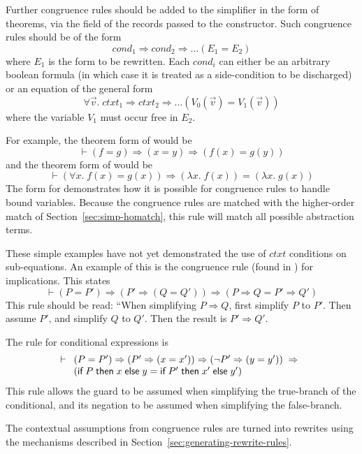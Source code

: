 Further congruence rules should be added to the simplifier in the form
of theorems, via the  field of the records passed to the
 constructor.  Such congruence rules should be of the form
\[
\mathit{cond_1} \Rightarrow \mathit{cond_2} \Rightarrow \dots (E_1 =
E_2)
\]
where $E_1$ is the form to be rewritten.  Each $\mathit{cond}_i$ can
either be an arbitrary boolean formula (in which case it is treated as
a side-condition to be discharged) or an equation of the general form
\[
\forall \vec{v}. \;\mathit{ctxt}_1 \Rightarrow \mathit{ctxt}_2
\Rightarrow \dots (V_0(\vec{v}) = V_1(\vec{v}))
\]
where the variable $V_1$ must occur free in $E_2$.

For example, the theorem form of  would be
\[
\vdash (f = g) \Rightarrow (x = y) \Rightarrow (f(x) = g(y))
\]
and the theorem form of  would be
\[
\vdash (\forall x. \;f (x) = g (x)) \Rightarrow (\lambda x. \;f(x)) = (\lambda
x.\;g(x))
\]
The form for  demonstrates how it is possible for congruence
rules to handle bound variables.  Because the congruence rules are
matched with the higher-order match of Section~\ref{sec:simp-homatch},
this rule will match all possible abstraction terms.

These simple examples have not yet demonstrated the use of
$\mathit{ctxt}$ conditions on sub-equations.  An example of this is
the congruence rule (found in ) for implications.  This
states
\[
\vdash (P = P') \Rightarrow (P' \Rightarrow (Q = Q')) \Rightarrow
(P \Rightarrow Q = P' \Rightarrow Q')
\]
This rule should be read: ``When simplifying $P\Rightarrow Q$, first
simplify $P$ to $P'$.  Then assume $P'$, and simplify $Q$ to $Q'$.
Then the result is $P' \Rightarrow Q'$.

The rule for conditional expressions is
\[
\vdash \begin{array}[t]{l}
  (P = P') \Rightarrow (P' \Rightarrow (x = x')) \Rightarrow
  (\neg P' \Rightarrow (y = y')) \;\Rightarrow\\
       (\textsf{if}\;P\;\textsf{then}\;x\;\textsf{else}\;y =
       \textsf{if}\;P'\;\textsf{then}\;x'\;\textsf{else}\;y')
\end{array}
\]
This rule allows the guard to be assumed when simplifying the
true-branch of the conditional, and its negation to be assumed when
simplifying the false-branch.

The contextual assumptions from congruence rules are turned into
rewrites using the mechanisms described in
Section~\ref{sec:generating-rewrite-rules}.

